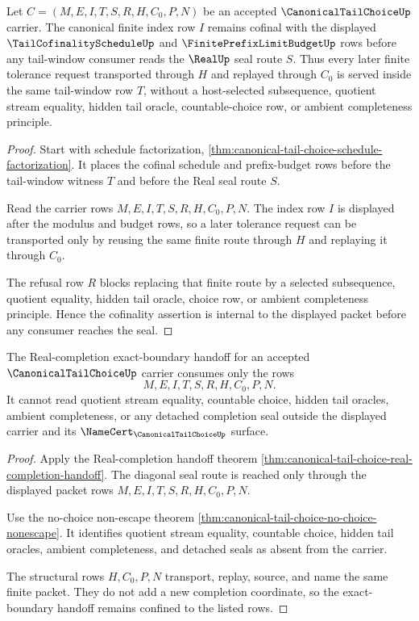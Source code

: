 \begin{theorem}
\label{thm:canonical-tail-choice-tail-cofinality}
Let $C=(M,E,I,T,S,R,H,C_0,P,N)$ be an accepted $\CanonicalTailChoiceUp$ carrier. The canonical finite index row $I$ remains cofinal with the displayed $\TailCofinalityScheduleUp$ and $\FinitePrefixLimitBudgetUp$ rows before any tail-window consumer reads the $\RealUp$ seal route $S$. Thus every later finite tolerance request transported through $H$ and replayed through $C_0$ is served inside the same tail-window row $T$, without a host-selected subsequence, quotient stream equality, hidden tail oracle, countable-choice row, or ambient completeness principle.
\end{theorem}
\begin{proof}
Start with schedule factorization, \autoref{thm:canonical-tail-choice-schedule-factorization}. It places the cofinal schedule and prefix-budget rows before the tail-window witness $T$ and before the Real seal route $S$.

Read the carrier rows $M,E,I,T,S,R,H,C_0,P,N$. The index row $I$ is displayed after the modulus and budget rows, so a later tolerance request can be transported only by reusing the same finite route through $H$ and replaying it through $C_0$.

The refusal row $R$ blocks replacing that finite route by a selected subsequence, quotient equality, hidden tail oracle, choice row, or ambient completeness principle. Hence the cofinality assertion is internal to the displayed packet before any consumer reaches the seal.
\end{proof}

\begin{theorem}
\label{thm:canonical-tail-choice-real-completion-boundary}
The Real-completion exact-boundary handoff for an accepted $\CanonicalTailChoiceUp$ carrier consumes only the rows
$$
M,E,I,T,S,R,H,C_0,P,N.
$$
It cannot read quotient stream equality, countable choice, hidden tail oracles, ambient completeness, or any detached completion seal outside the displayed carrier and its $\NameCert_{\CanonicalTailChoiceUp}$ surface.
\end{theorem}
\begin{proof}
Apply the Real-completion handoff theorem \autoref{thm:canonical-tail-choice-real-completion-handoff}. The diagonal seal route is reached only through the displayed packet rows $M,E,I,T,S,R,H,C_0,P,N$.

Use the no-choice non-escape theorem \autoref{thm:canonical-tail-choice-no-choice-nonescape}. It identifies quotient stream equality, countable choice, hidden tail oracles, ambient completeness, and detached seals as absent from the carrier.

The structural rows $H,C_0,P,N$ transport, replay, source, and name the same finite packet. They do not add a new completion coordinate, so the exact-boundary handoff remains confined to the listed rows.
\end{proof}

